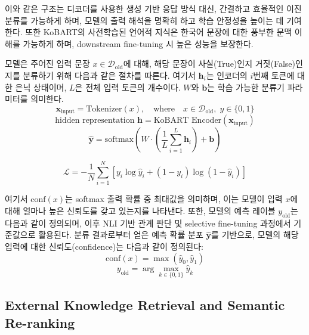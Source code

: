 \documentclass[a4paper,fleqn]{cas-sc}
\begin{document}
이와 같은 구조는 디코더를 사용한 생성 기반 응답 방식 대신, 간결하고 효율적인 이진 분류를 가능하게 하며, 모델의 출력 해석을 명확히 하고 학습 안정성을 높이는 데 기여한다. 
또한 KoBART의 사전학습된 언어적 지식은 한국어 문장에 대한 풍부한 문맥 이해를 가능하게 하며, downstream fine-tuning 시 높은 성능을 보장한다.

모델은 주어진 입력 문장 \( x \in \mathcal{D}_{\text{old}} \)에 대해, 해당 문장이 사실(True)인지 거짓(False)인지를 분류하기 위해 다음과 같은 절차를 따른다.
여기서 \( \mathbf{h}_i \)는 인코더의 \( i \)번째 토큰에 대한 은닉 상태이며, \( L \)은 전체 입력 토큰의 개수이다. 
\( W \)와 \( \mathbf{b} \)는 학습 가능한 분류기 파라미터를 의미한다. 
\begin{equation}
    \mathbf{x}_{\text{input}} = \text{Tokenizer}(x), \quad \text{where} \quad x \in \mathcal{D}_{\text{old}}, \; y \in \{0, 1\}
\end{equation}
\begin{equation}
    \text{hidden representation } \mathbf{h}  = \text{KoBART Encoder}(\mathbf{x}_{\text{input}}) 
\end{equation}
\begin{equation}
    \hat{\mathbf{y}} = \mathrm{softmax}\left( W \cdot \left( \frac{1}{L} \sum_{i=1}^{L} \mathbf{h}_i \right) + \mathbf{b} \right)
\end{equation}
\noindent

\begin{equation}
    \mathcal{L} = -\frac{1}{N} \sum_{i=1}^{N} \left[ y_i \log \hat{y}_i + (1 - y_i) \log (1 - \hat{y}_i) \right]
\end{equation}

여기서 \( \mathrm{conf}(x) \)는 softmax 출력 확률 중 최대값을 의미하며, 이는 모델이 입력 \( x \)에 대해 얼마나 높은 신뢰도를 갖고 있는지를 나타낸다. 
또한, 모델의 예측 레이블 \( y_{\text{old}} \)는 다음과 같이 정의되며, 이후 NLI 기반 관계 판단 및 selective fine-tuning 과정에서 기준값으로 활용된다.
분류 결과로부터 얻은 예측 확률 분포 \( \hat{\mathbf{y}} \)를 기반으로, 모델의 해당 입력에 대한 신뢰도(confidence)는 다음과 같이 정의된다:
\begin{equation}
    \mathrm{conf}(x) = \max \left( \hat{y}_0, \hat{y}_1 \right)
\end{equation}
\begin{equation}
    y_{\text{old}} = \arg\max_{k \in \{0, 1\}} \hat{y}_k
\end{equation}



\subsection{External Knowledge Retrieval and Semantic Re-ranking}
\end{document}
